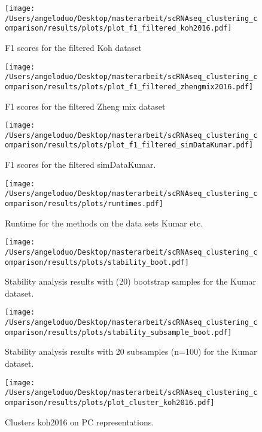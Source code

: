 \documentclass[11pt, a4paper]{article}\usepackage[]{graphicx}\usepackage[]{color}
\begin{document}
\begin{figure}[!h]
\texttt{[image: /Users/angeloduo/Desktop/masterarbeit/scRNAseq\_clustering\_comparison/results/plots/plot\_f1\_filtered\_koh2016.pdf]}
\caption{F1 scores for the filtered Koh dataset }
\label{fig:f1koh}
\end{figure}

\begin{figure}[!h]
\texttt{[image: /Users/angeloduo/Desktop/masterarbeit/scRNAseq\_clustering\_comparison/results/plots/plot\_f1\_filtered\_zhengmix2016.pdf]}
\caption{F1 scores for the filtered Zheng mix dataset }
\label{fig:f1zheng}
\end{figure}

\begin{figure}[!h]
\texttt{[image: /Users/angeloduo/Desktop/masterarbeit/scRNAseq\_clustering\_comparison/results/plots/plot\_f1\_filtered\_simDataKumar.pdf]}
\caption{F1 scores for the filtered simDataKumar. }
\label{fig:f1sim}
\end{figure}


\begin{figure}[!h]
\texttt{[image: /Users/angeloduo/Desktop/masterarbeit/scRNAseq\_clustering\_comparison/results/plots/runtimes.pdf]}
\caption{Runtime for the methods on the data sets Kumar etc. }
\label{fig:runtime}
\end{figure}

\begin{figure}[!h]
\texttt{[image: /Users/angeloduo/Desktop/masterarbeit/scRNAseq\_clustering\_comparison/results/plots/stability\_boot.pdf]}
\caption{Stability analysis results with (20) bootstrap samples for the Kumar dataset.}
\label{fig:boot}
\end{figure}

\begin{figure}[!h]
\texttt{[image: /Users/angeloduo/Desktop/masterarbeit/scRNAseq\_clustering\_comparison/results/plots/stability\_subsample\_boot.pdf]}
\caption{Stability analysis results with 20 subsamples (n=100) for the Kumar dataset.}
\label{fig:stab}
\end{figure}

\begin{figure}[!h]
\texttt{[image: /Users/angeloduo/Desktop/masterarbeit/scRNAseq\_clustering\_comparison/results/plots/plot\_cluster\_koh2016.pdf]}
\caption{Clusters koh2016 on PC representations. }
\label{fig:clusterkoh}
\end{figure}
\end{document}
